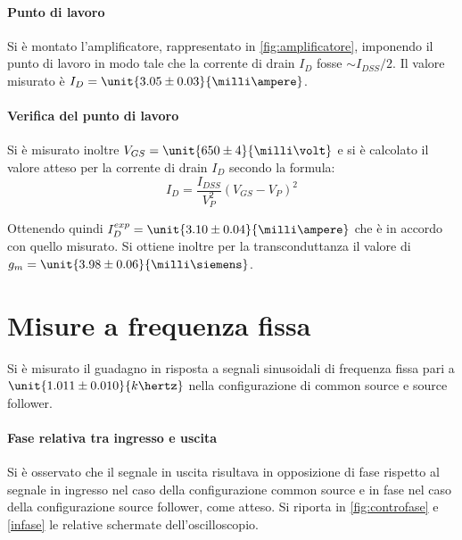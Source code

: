 \documentclass[10pt,a4paper]{article}
\begin{document}
\paragraph{Punto di lavoro} Si è montato l'amplificatore, rappresentato in \figurename{\ref{fig:amplificatore}}, imponendo il punto di lavoro in modo tale che la corrente di drain $I_D$ fosse $\sim I_{DSS}/2$. Il valore misurato è $I_D = \unit{3.05 \pm 0.03}{\milli\ampere}$.


\paragraph{Verifica del punto di lavoro} Si è misurato inoltre $V_{GS} = \unit{650 \pm 4}{\milli\volt}$ e si è calcolato il valore atteso per la corrente di drain $I_D$ secondo la formula:
\begin{equation*}
I_D = \frac{I_{DSS}}{V_P^2}(V_{GS} - V_P)^2
\end{equation*}

Ottenendo quindi $I_D^{exp} = \unit{3.10 \pm 0.04}{\milli\ampere}$ che è in accordo con quello misurato. Si ottiene inoltre per la transconduttanza il valore di $g_m = \unit{3.98 \pm 0.06}{\milli\siemens}$.

\section{Misure a frequenza fissa}

Si è misurato il guadagno in risposta a segnali sinusoidali di frequenza fissa pari a $\unit{1.011 \pm 0.010}{k\hertz}$ nella configurazione di common source e source follower.

\paragraph{Fase relativa tra ingresso e uscita} Si è osservato che il segnale in uscita risultava in opposizione di fase rispetto al segnale in ingresso nel caso della configurazione common source e in fase nel caso della configurazione source follower, come atteso. Si riporta in \figurename{\ref{fig:controfase}} e \figurename{\ref{infase}} le relative schermate dell'oscilloscopio.
\end{document}
